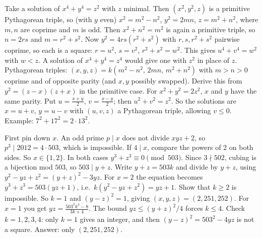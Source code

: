 \documentclass[11pt,a4paper]{article}
\begin{document}
 Take a solution of $x^4+y^4=z^2$ with $z$ minimal. Then $(x^2,y^2,z)$ is a primitive Pythagorean triple, so (with $y$ even) $x^2=m^2-n^2$, $y^2=2mn$, $z=m^2+n^2$, where $m,n$ are coprime and $m$ is odd.
 Then $x^2+n^2=m^2$ is again a primitive triple, so $n=2rs$ and $m=r^2+s^2$. Now $y^2=4rs(r^2+s^2)$ with $r,s,r^2+s^2$ pairwise coprime, so each is a square: $r=u^2$, $s=v^2$, $r^2+s^2=w^2$. This gives $u^4+v^4=w^2$ with $w<z$. A solution of $x^4+y^4=z^4$ would give one with $z^2$ in place of $z$.
 Pythagorean triples: $(x,y,z)=k(m^2-n^2,\,2mn,\,m^2+n^2)$ with $m>n>0$ coprime and of opposite parity (and $x,y$ possibly swapped). Derive this from $y^2=(z-x)(z+x)$ in the primitive case.
 For $x^2+y^2=2z^2$, $x$ and $y$ have the same parity. Put $u=\frac{x+y}2$, $v=\frac{x-y}2$; then $u^2+v^2=z^2$. So the solutions are $x=u+v$, $y=u-v$ with $(u,v,z)$ a Pythagorean triple, allowing $v\le0$. Example: $7^2+17^2=2\cdot13^2$.

 First pin down $x$. An odd prime $p\mid x$ does not divide $xyz+2$, so $p^3\mid2012=4\cdot503$, which is impossible. If $4\mid x$, compare the powers of $2$ on both sides. So $x\in\{1,2\}$.
 In both cases $y^3+z^3\equiv0\pmod{503}$. Since $3\nmid502$, cubing is a bijection mod $503$, so $503\mid y+z$. Write $y+z=503k$ and divide by $y+z$, using $y^2-yz+z^2=(y+z)^2-3yz$.
 For $x=2$ the equation becomes $y^3+z^3=503(yz+1)$, i.e.\ $k(y^2-yz+z^2)=yz+1$. Show that $k\ge2$ is impossible. So $k=1$ and $(y-z)^2=1$, giving $(x,y,z)=(2,251,252)$.
 For $x=1$ you get $yz=\frac{503^2k^3-8}{3k+4}$. The bound $yz\le(y+z)^2/4$ forces $k\le4$. Check $k=1,2,3,4$: only $k=1$ gives an integer, and then $(y-z)^2=503^2-4yz$ is not a square. Answer: only $(2,251,252)$.
\end{document}

